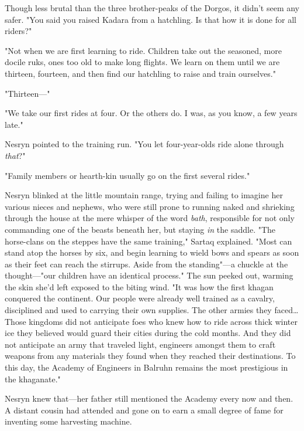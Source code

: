 Though less brutal than the three brother-peaks of the Dorgos, it didn't seem any safer.
"You said you raised Kadara from a hatchling.
Is that how it is done for all riders?"

"Not when we are first learning to ride.
Children take out the seasoned, more docile ruks, ones too old to make long flights.
We learn on them until we are thirteen, fourteen, and then find our hatchling to raise and train ourselves."

"Thirteen---"

"We take our first rides at four.
Or the others do.
I was, as you know, a few years late."

Nesryn pointed to the training run.
"You let four-year-olds ride alone through \emph{that}?"

"Family members or hearth-kin usually go on the first several rides."

Nesryn blinked at the little mountain range, trying and failing to imagine her various nieces and nephews, who were still prone to running naked and shrieking through the house at the mere whisper of the word \emph{bath}, responsible for not only commanding one of the beasts beneath her, but staying \emph{in} the saddle.
"The horse-clans on the steppes have the same training," Sartaq explained.
"Most can stand atop the horses by six, and begin learning to wield bows and spears as soon as their feet can reach the stirrups.
Aside from the standing"---a chuckle at the thought---"our children have an identical process."
The sun peeked out, warming the skin she'd left exposed to the biting wind.
"It was how the first khagan conquered the continent.
Our people were already well trained as a cavalry, disciplined and used to carrying their own supplies.
The other armies they faced\ldots Those kingdoms did not anticipate foes who knew how to ride across thick winter ice they believed would guard their cities during the cold months.
And they did not anticipate an army that traveled light, engineers amongst them to craft weapons from any materials they found when they reached their destinations.
To this day, the Academy of Engineers in Balruhn remains the most prestigious in the khaganate."

Nesryn knew that---her father still mentioned the Academy every now and then.
A distant cousin had attended and gone on to earn a small degree of fame for inventing some harvesting machine.

